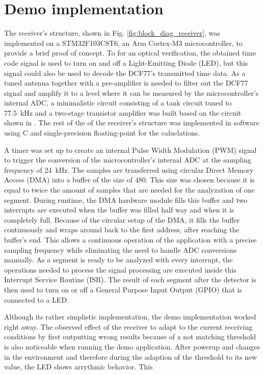\documentclass[conference]{IEEEtran}
\begin{document}
\section{Demo implementation}
The receiver's structure, shown in Fig. \ref{fig:block_diag_receiver}, was implemented on a STM32F103C8T6, an Arm Cortex-M3 microcontroller, to provide a brief proof of concept.
To for an optical verification, the obtained time code signal is used to turn on and off a Light-Emitting Diode (LED), but this signal
could also be used to decode the DCF77's transmitted time data.
As a tuned antenna together with a pre-amplifier is needed to filter out the DCF77 signal and amplify it to a level where it can be measured by the microcontroller's internal ADC, a minimalistic circuit 
consisting of a tank circuit tuned to \SI{77.5}{\kilo\hertz} and a two-stage transistor amplifier was built based on the circuit shown in \cite{b12}.
The rest of the of the receiver's structure was implemented in software using C and single-precision floating-point for the caluclations.
\par
A timer was set up to create an internal Pulse Width Modulation (PWM) signal to trigger the conversion of the microcontroller's internal ADC at the sampling frequency of \SI{24}{\kilo\hertz}.
The samples are transferred using circular Direct Memory Access (DMA) into a buffer of the size of $480$.
This size was chosen because it is equal to twice the amount of samples that are needed for the analyzation of one segment.
During runtime, the DMA hardware module fills this buffer and two interrupts are executed when the buffer was filled half way and when it is completely full.
Because of the circular setup of the DMA, it fills the buffer continuously and wraps around back to the first address, after reaching the buffer's end.
This allows a continuous operation of the application with a precise sampling frequency while eliminating the need to handle ADC conversions manually. 
As a segment is ready to be analyzed with every interrupt, the operations needed to process the signal processing are executed inside this Interrupt Service Routine (ISR).
The result of each segment after the detector is then used to turn on or off a General Purpose Input Output (GPIO) that is connected to a LED.
\par
Although its rather simplistic implementation, the demo implementation worked right away.
The observed effect of the receiver to adapt to the current receiving conditions by first outputting wrong results because of a
not matching threshold is also noticeable when running the demo application.
After powerup and changes in the environment and therefore during the adaption of the threshold to its new value, the LED shows
arrythmic behavior.
This 
\end{document}
